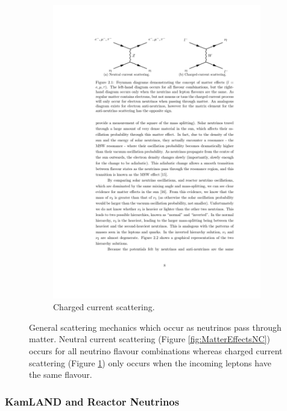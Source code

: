 \begin{figure}
\begin{subfigure}{0.48\linewidth}
    \includegraphics{MatterEffectsCC.pdf}
    \caption{Charged current scattering.}
    \label{fig:MatterEffectsCC}
  \end{subfigure}
  \caption{General scattering mechanics which occur as neutrinos pass through matter.  Neutral current scattering (Figure \ref{fig:MatterEffectsNC}) occurs for all neutrino flavour combinations whereas charged current scattering (Figure \ref{fig:MatterEffectsCC}) only occurs when the incoming leptons have the same flavour.}
  \label{fig:MatterEffects}
\end{figure}

\subsubsection{KamLAND and Reactor Neutrinos}\label{sec:KamLAND}

